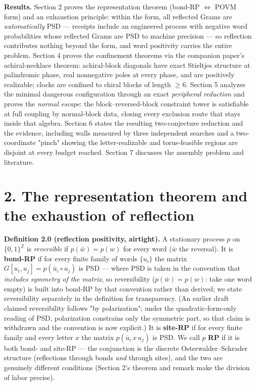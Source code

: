\documentclass[11pt]{article}
\begin{document}
\textbf{Results.}  Section 2 proves the representation theorem (bond-RP $\iff$ POVM form) and an exhaustion principle: within the form, all reflected Grams are \emph{automatically} PSD — receipts include an engineered process with negative word probabilities whose reflected Grams are PSD to machine precision — so reflection contributes nothing beyond the form, and word positivity carries the entire problem.  Section 4 proves the confinement theorems via the companion paper's achiral-necklace theorem: achiral-block diagonals have exact Stieltjes structure at palindromic phase, real nonnegative poles at every phase, and are positively realizable; clocks are confined to chiral blocks of length $\ge 6$.  Section 5 analyzes the minimal dangerous configuration through an exact \emph{peripheral reduction} and proves the \emph{normal escape}: the block–reversed-block constraint tower is satisfiable at full coupling by normal-block data, closing every exclusion route that stays inside that algebra.  Section 6 states the resulting two-conjecture reduction and the evidence, including walls measured by three independent searches and a two-coordinate "pinch" showing the letter-realizable and torus-feasible regions are disjoint at every budget reached. Section 7 discusses the assembly problem and literature.

\section*{2. The representation theorem and the exhaustion of reflection}
\textbf{Definition 2.0 (reflection positivity, airtight).}  A stationary process $p$ on $\{0,1\}^{\mathbb Z}$ is \emph{reversible} if $p(\bar w) = p(w)$ for every word ($\bar w$ the reversal).  It is \textbf{bond-RP} if for every finite family of words $\{u_i\}$ the matrix $G[u_i, u_j] = p(\bar u_i \circ u_j)$ is PSD — where PSD is taken in the convention that \emph{includes symmetry of the matrix}, so reversibility ($p(\bar w) = p(w)$: take one word empty) is built into bond-RP by that convention rather than derived; we state reversibility separately in the definition for transparency.  (An earlier draft claimed reversibility follows "by polarization"; under the quadratic-form-only reading of PSD, polarization constrains only the symmetric part, so that claim is withdrawn and the convention is now explicit.)  It is \textbf{site-RP} if for every finite family and every letter $x$ the matrix $p(\bar u_i \, x \, u_j)$ is PSD.  We call $p$ \textbf{RP} if it is both bond- and site-RP — the conjunction is the discrete Osterwalder–Schrader structure (reflections through bonds \emph{and} through sites), and the two are genuinely different conditions (Section 2's theorem and remark make the division of labor precise).
\end{document}
